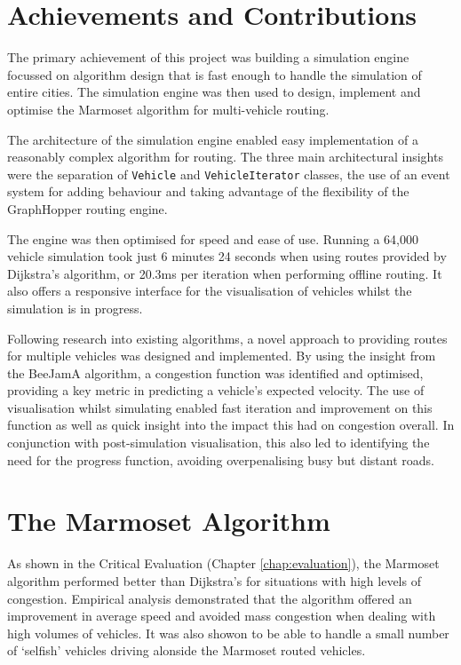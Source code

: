 \documentclass[ %
                    author={Alexander Hill},
                supervisor={Dr. Benjamin Sach},
                    degree={MEng},
                     title={MARMOSET},
                  subtitle={Multi-Agent Route Management using Online Simulation for Efficient Transportation},
                      type={research},
                      year={2016} ]{dissertation}
\begin{document}
\section{Achievements and Contributions}

The primary achievement of this project was building a simulation engine focussed
on algorithm design that is fast enough to handle the simulation of entire cities.
The simulation engine was then used to design, implement and optimise the
Marmoset algorithm for multi-vehicle routing.

The architecture of the simulation engine enabled easy implementation of a
reasonably complex algorithm for routing. The three main architectural insights
were the separation of \texttt{Vehicle} and \texttt{VehicleIterator} classes,
the use of an event system for adding behaviour and taking advantage of the
flexibility of the GraphHopper routing engine.

The engine was then optimised for speed and ease of use. Running a 64,000
vehicle simulation took just 6 minutes 24 seconds when using routes provided by
Dijkstra's algorithm, or 20.3ms per iteration when performing offline routing.
It also offers a responsive interface for the visualisation of vehicles whilst
the simulation is in progress.

Following research into existing algorithms, a novel approach to providing
routes for multiple vehicles was designed and implemented. By using the insight
from the BeeJamA algorithm, a congestion function was identified and optimised,
providing a key metric in predicting a vehicle's expected velocity. The use of
visualisation whilst simulating enabled fast iteration and improvement on this
function as well as quick insight into the impact this had on congestion
overall. In conjunction with post-simulation visualisation, this also led to
identifying the need for the progress function, avoiding overpenalising busy but
distant roads.

\section{The Marmoset Algorithm}

As shown in the Critical Evaluation (Chapter \ref{chap:evaluation}), the
Marmoset algorithm performed better than Dijkstra's for situations with high
levels of congestion. Empirical analysis demonstrated that the algorithm offered
an improvement in average speed and avoided mass congestion when dealing with
high volumes of vehicles. It was also showon to be able to handle a small number
of `selfish' vehicles driving alonside the Marmoset routed vehicles.
\end{document}
